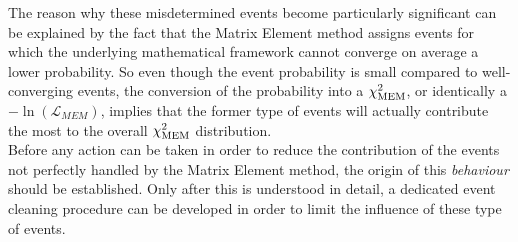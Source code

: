 The reason why these misdetermined events become particularly significant can be explained by the fact that the Matrix Element method assigns events for which the underlying mathematical framework cannot converge on average a lower probability. So even though the event probability is small compared to well-converging events, the conversion of the probability into a $\chi^{2}_{\textrm{MEM}}$, or identically a $-\ln(\mathcal{L}_{MEM})$, implies that the former type of events will actually contribute the most to the overall $\chi^{2}_{\textrm{MEM}}$ distribution.
\\

Before any action can be taken in order to reduce the contribution of the events not perfectly handled by the Matrix Element method, the origin of this \textit{behaviour} should be established.
Only after this is understood in detail, a dedicated event cleaning procedure can be developed in order to limit the influence of these type of events.
%
%
%

